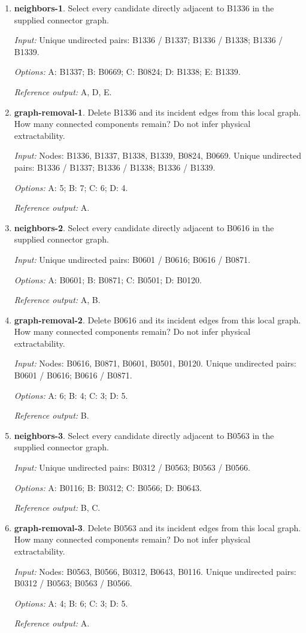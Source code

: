 \begin{enumerate}
\item \textbf{neighbors-1}. Select every candidate directly adjacent to B1336 in the supplied connector graph.\par {\small \textit{Input:} Unique undirected pairs: B1336 / B1337; B1336 / B1338; B1336 / B1339. \par\textit{Options:} A: B1337; B: B0669; C: B0824; D: B1338; E: B1339. \par\textit{Reference output:} A, D, E.}
\item \textbf{graph-removal-1}. Delete B1336 and its incident edges from this local graph. How many connected components remain? Do not infer physical extractability.\par {\small \textit{Input:} Nodes: B1336, B1337, B1338, B1339, B0824, B0669. Unique undirected pairs: B1336 / B1337; B1336 / B1338; B1336 / B1339. \par\textit{Options:} A: 5; B: 7; C: 6; D: 4. \par\textit{Reference output:} A.}
\item \textbf{neighbors-2}. Select every candidate directly adjacent to B0616 in the supplied connector graph.\par {\small \textit{Input:} Unique undirected pairs: B0601 / B0616; B0616 / B0871. \par\textit{Options:} A: B0601; B: B0871; C: B0501; D: B0120. \par\textit{Reference output:} A, B.}
\item \textbf{graph-removal-2}. Delete B0616 and its incident edges from this local graph. How many connected components remain? Do not infer physical extractability.\par {\small \textit{Input:} Nodes: B0616, B0871, B0601, B0501, B0120. Unique undirected pairs: B0601 / B0616; B0616 / B0871. \par\textit{Options:} A: 6; B: 4; C: 3; D: 5. \par\textit{Reference output:} B.}
\item \textbf{neighbors-3}. Select every candidate directly adjacent to B0563 in the supplied connector graph.\par {\small \textit{Input:} Unique undirected pairs: B0312 / B0563; B0563 / B0566. \par\textit{Options:} A: B0116; B: B0312; C: B0566; D: B0643. \par\textit{Reference output:} B, C.}
\item \textbf{graph-removal-3}. Delete B0563 and its incident edges from this local graph. How many connected components remain? Do not infer physical extractability.\par {\small \textit{Input:} Nodes: B0563, B0566, B0312, B0643, B0116. Unique undirected pairs: B0312 / B0563; B0563 / B0566. \par\textit{Options:} A: 4; B: 6; C: 3; D: 5. \par\textit{Reference output:} A.}

\end{enumerate}
